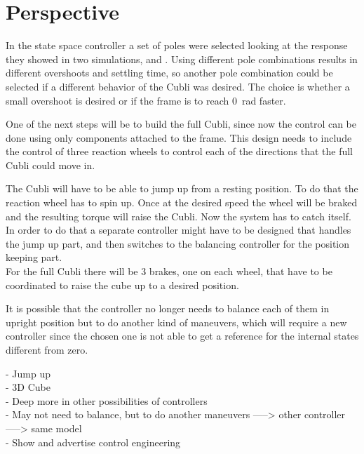 \chapter{Perspective}

In the state space controller a set of poles were selected looking at the response they showed in two simulations,  and . Using different pole combinations results in different overshoots and settling time, so another pole combination could be selected if a different behavior of the Cubli was desired. The choice is whether a small overshoot is desired or if the frame is to reach \SI{0}{rad} faster.

One of the next steps will be to build the full Cubli, since now the control can be done using only components attached to the frame. This design needs to include the control of three reaction wheels to control each of the directions that the full Cubli could move in.

The Cubli will have to be able to jump up from a resting position. To do that the reaction wheel has to spin up. Once at the desired speed the wheel will be braked and the resulting torque will raise the Cubli. Now the system has to catch itself. In order to do that a separate controller might have to be designed that handles the jump up part, and then switches to the balancing controller for the position keeping part.\\
For the full Cubli there will be 3 brakes, one on each wheel, that have to be coordinated to raise the cube up to a desired position.

It is possible that the controller no longer needs to balance each of them in upright position but to do another kind of maneuvers, which will require a new controller since the chosen one is not able to get a reference for the internal states different from zero.


- Jump up\\
- 3D Cube\\
- Deep more in other possibilities of controllers\\
- May not need to balance, but to do another maneuvers -----> other controller -----> same model\\
- Show and advertise control engineering \\